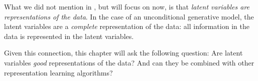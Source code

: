 What we did not mention in \chap{\ref{chapter:generative_models}}, but will focus on now, is that \textit{latent variables are representations of the data}. In the case of an unconditional generative model, the latent variables are a \textit{complete} representation of the data: all information in the data is represented in the latent variables.

Given this connection, this chapter will ask the following question: Are latent variables \textit{good} representations of the data? And can they be combined with other representation learning algorithms?



